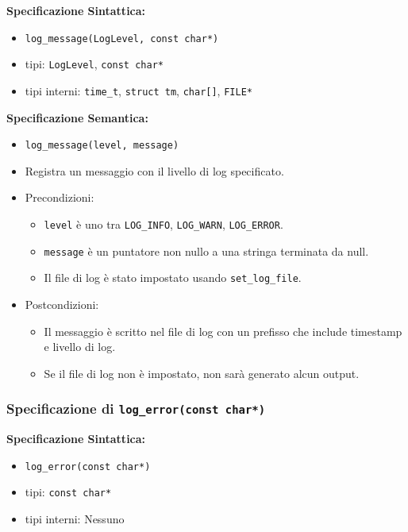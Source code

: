 \documentclass[11pt]{scrartcl} %
\begin{document}
\textbf{Specificazione Sintattica:}
\begin{itemize}
	\item \texttt{log\_message(LogLevel, const char*)}
	\item tipi: \texttt{LogLevel}, \texttt{const char*}
	\item tipi interni: \texttt{time\_t}, \texttt{struct tm}, \texttt{char[]}, \texttt{FILE*}
\end{itemize}

\textbf{Specificazione Semantica:}
\begin{itemize}
	\item \texttt{log\_message(level, message)}
	\item Registra un messaggio con il livello di log specificato.
	\item Precondizioni:
	      \begin{itemize}
		      \item \texttt{level} è uno tra \texttt{LOG\_INFO}, \texttt{LOG\_WARN}, \texttt{LOG\_ERROR}.
		      \item \texttt{message} è un puntatore non nullo a una stringa terminata da null.
		      \item Il file di log è stato impostato usando \texttt{set\_log\_file}.
	      \end{itemize}
	\item Postcondizioni:
	      \begin{itemize}
		      \item Il messaggio è scritto nel file di log con un prefisso che include timestamp e livello di log.
		      \item Se il file di log non è impostato, non sarà generato alcun output.
	      \end{itemize}
\end{itemize}

\subsubsection{Specificazione di \texttt{log\_error(const char*)}}

\textbf{Specificazione Sintattica:}
\begin{itemize}
	\item \texttt{log\_error(const char*)}
	\item tipi: \texttt{const char*}
	\item tipi interni: Nessuno
\end{itemize}
\end{document}
